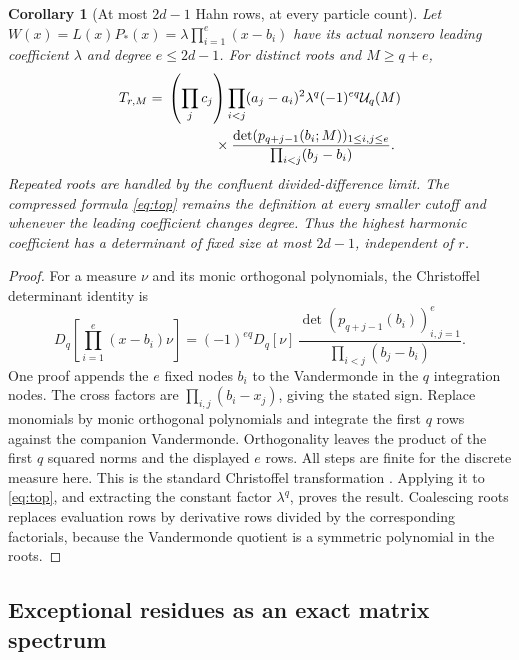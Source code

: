 \documentclass[11pt,letterpaper]{article}
\numberwithin{equation}{section}
\newtheorem{corollary}[theorem]{Corollary}
\theoremstyle{definition}\newtheorem{definition}[theorem]{Definition}
\theoremstyle{remark}\newtheorem{remark}[theorem]{Remark}
\begin{document}
\begin{corollary}[At most $2d-1$ Hahn rows, at every particle count]
\label{thm:fixedsize}
Let $W(x)=L(x)P_*(x)=\lambda\prod_{i=1}^e(x-b_i)$ have its actual
nonzero leading coefficient $\lambda$ and degree $e\le2d-1$.
For distinct roots and $M\ge q+e$,
\begin{equation}\label{eq:fixedsize}
 \begin{split}
 T_{r,M}={}&\left(\prod_jc_j\right)\prod_{i<j}(a_j-a_i)^2
      \lambda^q(-1)^{eq}\mathcal U_q(M)\\
 &\hspace{12mm}\times
       \frac{\det(p_{q+j-1}(b_i;M))_{1\le i,j\le e}}
                    {\prod_{i<j}(b_j-b_i)}.
 \end{split}
\end{equation}
Repeated roots are handled by the confluent divided-difference limit.
The compressed formula \eqref{eq:top} remains the definition at every
smaller cutoff and whenever the leading coefficient changes degree.
Thus the highest harmonic coefficient has a determinant of fixed size
at most $2d-1$, independent of $r$.
\end{corollary}
\begin{proof}
For a measure $\nu$ and its monic orthogonal polynomials, the
Christoffel determinant identity is
\[
 D_q\!\left[\prod_{i=1}^e(x-b_i)\nu\right]
 =(-1)^{eq}D_q[\nu]\,
           \frac{\det(p_{q+j-1}(b_i))_{i,j=1}^e}{\prod_{i<j}(b_j-b_i)}.
\]
One proof appends the $e$ fixed nodes $b_i$ to the Vandermonde in the
$q$ integration nodes. The cross factors are
$\prod_{i,j}(b_i-x_j)$, giving the stated sign. Replace monomials by
monic orthogonal polynomials and integrate the first $q$ rows against
the companion Vandermonde. Orthogonality leaves the product of the
first $q$ squared norms and the displayed $e$ rows. All steps are
finite for the discrete measure here. This is the standard
Christoffel transformation \cite{krattenthaler}. Applying it to
\eqref{eq:top}, and extracting the constant factor $\lambda^q$,
proves the result. Coalescing roots replaces evaluation rows by
derivative rows divided by the corresponding factorials, because the
Vandermonde quotient is a symmetric polynomial in the roots.
\end{proof}

\subsection{Exceptional residues as an exact matrix spectrum}
\end{document}
